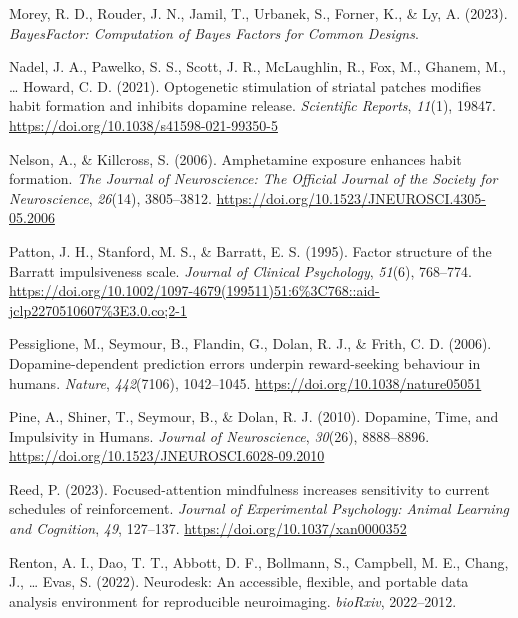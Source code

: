 \documentclass[
  man]{apa6}
\newlength{\cslhangindent}
\newlength{\cslentryspacingunit} %
\newenvironment{CSLReferences}[2] %
 {%
  \setlength{\parindent}{0pt}
  \ifodd #1
  \let\oldpar\par
  \def\par{\hangindent=\cslhangindent\oldpar}
  \fi
  \setlength{\parskip}{#2\cslentryspacingunit}
 }%
 {}
\begin{document}
\begin{CSLReferences}{1}{0}
\leavevmode{}%
Morey, R. D., Rouder, J. N., Jamil, T., Urbanek, S., Forner, K., \& Ly, A. (2023). \emph{{BayesFactor}: {Computation} of {Bayes Factors} for {Common Designs}}.

\leavevmode{}%
Nadel, J. A., Pawelko, S. S., Scott, J. R., McLaughlin, R., Fox, M., Ghanem, M., \ldots{} Howard, C. D. (2021). Optogenetic stimulation of striatal patches modifies habit formation and inhibits dopamine release. \emph{Scientific Reports}, \emph{11}(1), 19847. \url{https://doi.org/10.1038/s41598-021-99350-5}

\leavevmode{}%
Nelson, A., \& Killcross, S. (2006). Amphetamine exposure enhances habit formation. \emph{The Journal of Neuroscience: The Official Journal of the Society for Neuroscience}, \emph{26}(14), 3805--3812. \url{https://doi.org/10.1523/JNEUROSCI.4305-05.2006}

\leavevmode{}%
Patton, J. H., Stanford, M. S., \& Barratt, E. S. (1995). Factor structure of the {Barratt} impulsiveness scale. \emph{Journal of Clinical Psychology}, \emph{51}(6), 768--774. \url{https://doi.org/10.1002/1097-4679(199511)51:6\%3C768::aid-jclp2270510607\%3E3.0.co;2-1}

\leavevmode{}%
Pessiglione, M., Seymour, B., Flandin, G., Dolan, R. J., \& Frith, C. D. (2006). Dopamine-dependent prediction errors underpin reward-seeking behaviour in humans. \emph{Nature}, \emph{442}(7106), 1042--1045. \url{https://doi.org/10.1038/nature05051}

\leavevmode{}%
Pine, A., Shiner, T., Seymour, B., \& Dolan, R. J. (2010). Dopamine, {Time}, and {Impulsivity} in {Humans}. \emph{Journal of Neuroscience}, \emph{30}(26), 8888--8896. \url{https://doi.org/10.1523/JNEUROSCI.6028-09.2010}

\leavevmode{}%
Reed, P. (2023). Focused-attention mindfulness increases sensitivity to current schedules of reinforcement. \emph{Journal of Experimental Psychology: Animal Learning and Cognition}, \emph{49}, 127--137. \url{https://doi.org/10.1037/xan0000352}

\leavevmode{}%
Renton, A. I., Dao, T. T., Abbott, D. F., Bollmann, S., Campbell, M. E., Chang, J., \ldots{} Evas, S. (2022). Neurodesk: {An} accessible, flexible, and portable data analysis environment for reproducible neuroimaging. \emph{bioRxiv}, 2022--2012.


\end{CSLReferences}
\end{document}
